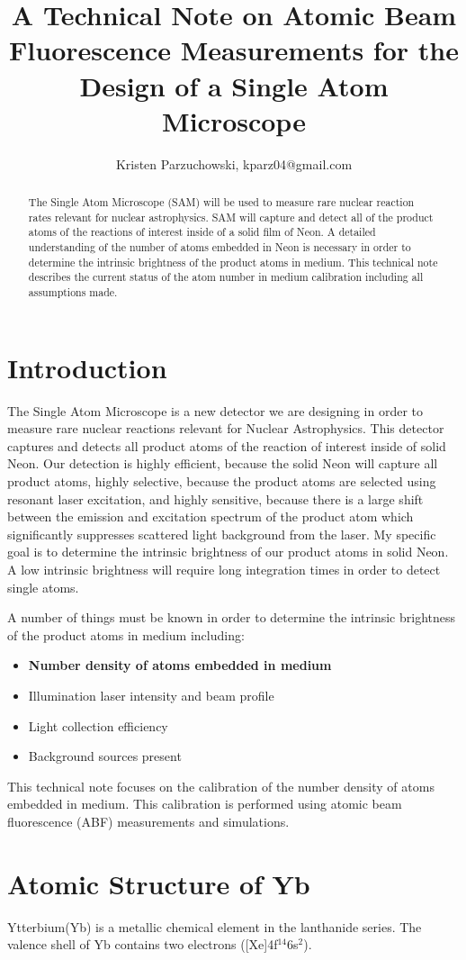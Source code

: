 \documentclass[12pt, a4paper]{article}
\title{A Technical Note on Atomic Beam Fluorescence Measurements for the Design of a Single Atom Microscope}
\author{Kristen Parzuchowski, kparz04@gmail.com}
\date{\parbox{\linewidth}{\centering%
  \today\endgraf\bigskip
  Version 2.0}}
\begin{document}
\maketitle
\begin{abstract}
The Single Atom Microscope (SAM) will be used to measure rare nuclear reaction rates relevant for nuclear astrophysics. SAM will capture and detect all of the product atoms of the reactions of interest inside of a solid film of Neon. A detailed understanding of the number of atoms embedded in Neon is necessary in order to determine the intrinsic brightness of the product atoms in medium. This technical note describes the current status of the atom number in medium calibration including all assumptions made.
\end{abstract}
\section{Introduction}
The Single Atom Microscope is a new detector we are designing in order to measure rare nuclear reactions relevant for Nuclear Astrophysics. This detector captures and detects all product atoms of the reaction of interest inside of solid Neon. Our detection is highly efficient, because the solid Neon will capture all product atoms, highly selective, because the product atoms are selected using resonant laser excitation, and highly sensitive, because there is a large shift between the emission and excitation spectrum of the product atom which significantly suppresses scattered light background from the laser. My specific goal is to determine the intrinsic brightness of our product atoms in solid Neon. A low intrinsic brightness will require long integration times in order to detect single atoms. 

A number of things must be known in order to determine the intrinsic brightness of the product atoms in medium including:
\begin{itemize}
\item \textbf{Number density of atoms embedded in medium}
\item Illumination laser intensity and beam profile
\item Light collection efficiency
\item Background sources present
\end{itemize}
This technical note focuses on the calibration of the number density of atoms embedded in medium. This calibration is performed using atomic beam fluorescence (ABF) measurements and simulations. 
\section{Atomic Structure of Yb}
Ytterbium(Yb) is a metallic chemical element in the lanthanide series. The valence shell of Yb contains two electrons ([Xe]4f$^{14}$6s$^{2}$).
\end{document}
